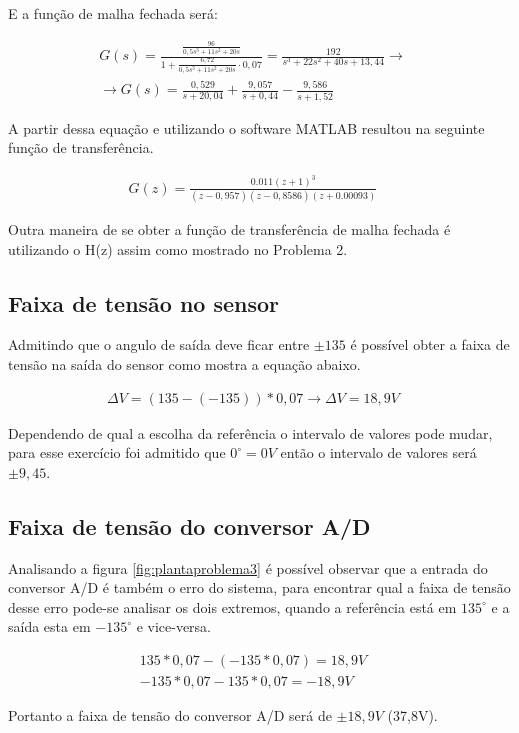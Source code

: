 \documentclass[a4paper,12pt]{article}
\begin{document}
	E a função de malha fechada será:
	
	
	\begin{equation}
		\left.
		\begin{array}{c}
			\displaystyle G(s) = \frac{\displaystyle \frac{96}{0,5s^3 + 11s^2 + 20s}}{1 + \displaystyle \frac{6,72}{0,5s^3 + 11s^2 + 20s}\cdot 0,07} = \frac{192}{s^3 + 22s^2 +40s + 13,44} \rightarrow \\[30pt]
			
			 \rightarrow  \displaystyle G(s) = \frac{0,529}{s+20,04} + \frac{9,057}{s+0,44} - \frac{9,586}{s+1,52}
		\end{array}
		\right.
		\quad 
	\end{equation}
	
	A partir dessa equação e utilizando o software MATLAB resultou na seguinte função de transferência.
	
	\begin{equation}
		\left.
		\begin{array}{c}
			\displaystyle G(z) = \frac{0.011(z+1)^3}{(z-0,957)(z-0,8586)(z+0.00093)}
		\end{array}
		\right.
		\quad 
	\end{equation}
	
	Outra maneira de se obter a função de transferência de malha fechada é utilizando o H(z) assim como mostrado no Problema 2.
	
	\subsection{Faixa de tensão no sensor}
		Admitindo que o angulo de saída deve ficar entre $\pm135$ é possível obter a faixa de tensão na saída do sensor como mostra a equação abaixo.
		
		\begin{equation}
			\left.
			\begin{array}{c}
				\displaystyle \Delta V = (135 - (-135)) * 0,07 \rightarrow \Delta V = 18,9V
			\end{array}
			\right.
			\quad 
		\end{equation}
		
		Dependendo de qual a escolha da referência o intervalo de valores pode mudar, para esse exercício foi admitido que $0^\circ = 0V$ então o intervalo de valores será $\pm 9,45$.
		
	\subsection{Faixa de tensão do conversor A/D}
		Analisando a figura \ref{fig:plantaproblema3} é possível observar que a entrada do conversor A/D é também o erro do sistema, para encontrar qual a faixa de tensão desse erro pode-se analisar os dois extremos, quando a referência está em $135^\circ$ e a saída esta em $-135^\circ$  e vice-versa.
		
		
		\begin{equation}
			\left.
			\begin{array}{c}
				\displaystyle 135*0,07 - (-135*0,07) = 18,9V \\[10pt]
				\displaystyle -135*0,07 - 135*0,07 = -18,9V 
			\end{array}
			\right.
			\quad 
		\end{equation}
		
		Portanto a faixa de tensão do conversor A/D será de $\pm18,9V$ (37,8V).
		
\end{document}
